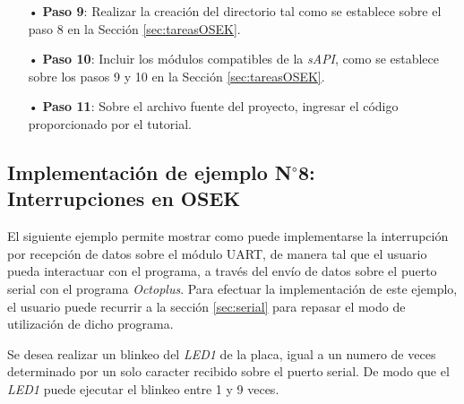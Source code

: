 \documentclass[12pt,letterpaper]{article}
\begin{document}
\begin{enumerate}
\item[•]\textbf{Paso 9}: Realizar la creación del directorio tal como se establece sobre el paso 8 en la Sección \ref{sec:tareasOSEK}.
\item[•]\textbf{Paso 10}: Incluir los módulos compatibles de la \textit{sAPI}, como se establece sobre los pasos 9 y 10 en la Sección \ref{sec:tareasOSEK}.
\item[•]\textbf{Paso 11}: Sobre el archivo fuente del proyecto, ingresar el código proporcionado por el tutorial.
\end{enumerate}
\subsection{Implementación de ejemplo N$^{\circ}$8: Interrupciones en OSEK}
El siguiente ejemplo permite mostrar como puede implementarse la interrupción por recepción de datos sobre el módulo UART, de manera tal que el usuario pueda interactuar con el programa, a través del envío de datos sobre el puerto serial con el programa \textit{Octoplus}. Para efectuar la implementación de este ejemplo, el usuario puede recurrir a la sección \ref{sec:serial} para repasar el modo de utilización de dicho programa.

Se desea realizar un blinkeo del \textit{LED1} de la placa, igual a un numero de veces determinado por un solo caracter recibido sobre el puerto serial. De modo que el \textit{LED1} puede ejecutar el blinkeo entre 1 y 9 veces.
\end{document}
